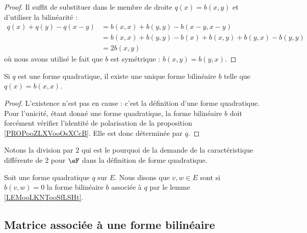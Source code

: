 \begin{proof}
    Il suffit de substituer dans le membre de droite \( q(x)=b(x,y)\) et d'utiliser la bilinéarité :
    \begin{subequations}
        \begin{align}
            q(x)+q(y)-q(x-y)&=b(x,x)+b(y,y)-b(x-y,x-y)\\
            &=b(x,x)+b(y,y)-b(x)+b(x,y)+b(y,x)-b(y,y)\\
            &=2b(x,y)
        \end{align}
    \end{subequations}
    où nous avons utilisé le fait que \( b\) est symétrique : \( b(x,y)=b(y,x)\).
\end{proof}

\begin{lemma}       \label{LEMooLKNTooSfLSHt}
    Si \( q\) est une forme quadratique, il existe une unique forme bilinéaire \( b\) telle que \( q(x)=b(x,x)\).
\end{lemma}

\begin{proof}
    L'existence n'est pas en cause : c'est la définition d'une forme quadratique. Pour l'unicité, étant donné une forme quadratique, la forme bilinéaire \( b\) doit forcément vérifier l'identité de polarisation de la proposition \ref{PROPooZLXVooOsXCcB}. Elle est donc déterminée par \( q\).
\end{proof}
Notons la division par \( 2\) qui est le pourquoi de la demande de la caractéristique différente de \( 2\) pour \( \eF\) dans la définition de forme quadratique.

\begin{definition}      \label{DEFooGECOooCCGVXG}
    Soit une forme quadratique \( q\) sur \( E\). Nous disons que \( v,w\in E\) sont  si \( b(v,w)=0\) la forme bilinéaire \( b\) associée à \( q\) par le lemme \ref{LEMooLKNTooSfLSHt}.
\end{definition}

\subsection{Matrice associée à une forme bilinéaire}

